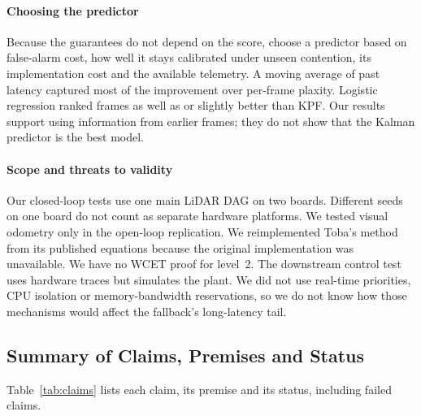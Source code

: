 \documentclass[acmsmall,screen]{acmart}
\begin{document}
\paragraph{Choosing the predictor} Because the guarantees do not depend on the score, choose a predictor based on false-alarm cost, how well it stays calibrated under unseen contention, its implementation cost and the available telemetry. A moving average of past latency captured most of the improvement over per-frame plaxity. Logistic regression ranked frames as well as or slightly better than KPF. Our results support using information from earlier frames; they do not show that the Kalman predictor is the best model.

\paragraph{Scope and threats to validity} Our closed-loop tests use one main LiDAR DAG on two boards. Different seeds on one board do not count as separate hardware platforms. We tested visual odometry only in the open-loop replication. We reimplemented Toba's method from its published equations because the original implementation was unavailable. We have no WCET proof for level~2. The downstream control test uses hardware traces but simulates the plant. We did not use real-time priorities, CPU isolation or memory-bandwidth reservations, so we do not know how those mechanisms would affect the fallback's long-latency tail.

\subsection{Summary of Claims, Premises and Status}\label{sec:eval-claims}

Table~\ref{tab:claims} lists each claim, its premise and its status, including failed claims.
\end{document}
